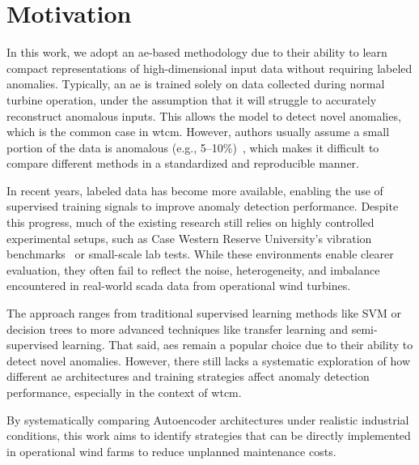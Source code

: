 \section{Motivation}
\label{sec:motivation}
In this work, we adopt an \gls{ae}-based methodology due to their ability to learn compact representations of high-dimensional input data without requiring labeled anomalies.
Typically, an \gls{ae} is trained solely on data collected during normal turbine operation, under the assumption that it will struggle to accurately reconstruct anomalous inputs.
This allows the model to detect novel anomalies, which is the common case in \gls{wtcm}.
However, authors usually assume a small portion of the data is anomalous (e.g., 5--10\%)~\citep{fan_analytical_2018}, which makes it difficult to compare different methods in a standardized and reproducible manner.

In recent years, labeled data has become more available, enabling the use of supervised training signals to improve anomaly detection performance.
Despite this progress, much of the existing research still relies on highly controlled experimental setups, such as Case Western Reserve University's vibration benchmarks~\citep{wen_new_2019} or small-scale lab tests.
While these environments enable clearer evaluation, they often fail to reflect the noise, heterogeneity, and imbalance encountered in real-world \gls{scada} data from operational wind turbines.

The approach ranges from traditional supervised learning methods like SVM or decision trees to more advanced techniques like transfer learning and semi-supervised learning.
That said, \glspl{ae} remain a popular choice due to their ability to detect novel anomalies.
However, there still lacks a systematic exploration of how different \gls{ae} architectures and training strategies affect anomaly detection performance, especially in the context of \gls{wtcm}.

By systematically comparing Autoencoder architectures under realistic industrial conditions, this work aims to identify strategies that can be directly implemented in operational wind farms to reduce unplanned maintenance costs.

